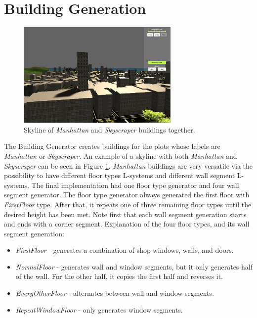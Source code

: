 \section{Building Generation}

\begin{figure}[H]
  \centering

  \includegraphics[width=0.7\textwidth]{figure/skyline.PNG}
  \caption{Skyline of \textit{Manhattan} and \textit{Skyscraper} buildings together.}

  \label{fig:skyline-result}
\end{figure}


The Building Generator creates buildings for the plots whose labels are \textit{Manhattan} or \textit{Skyscraper}. 
An example of a skyline with both \textit{Manhattan} and \textit{Skyscraper} can be seen in Figure \ref{fig:skyline-result}.
\textit{Manhattan} buildings are very versatile via the possibility to have different floor types L-systems and different wall segment L-systems.
The final implementation had one floor type generator and four wall segment generator. 
The floor type generator always generated the first floor with \textit{FirstFloor} type.
After that, it repeats one of three remaining floor types until the desired height has been met. 
Note first that each wall segment generation starts and ends with a corner segment. 
Explanation of the four floor types, and its wall segment generation:

\begin{itemize}
  \item \textit{FirstFloor} - generates a combination of shop windows, walls, and doors. 
  \item \textit{NormalFloor} - generates wall and window segments, but it only generates half of the wall. For the other half, it copies the first half and reverses it. 
  \item \textit{EveryOtherFloor} - alternates between wall and window segments.
  \item \textit{RepeatWindowFloor} - only generates window segments.
\end{itemize}

